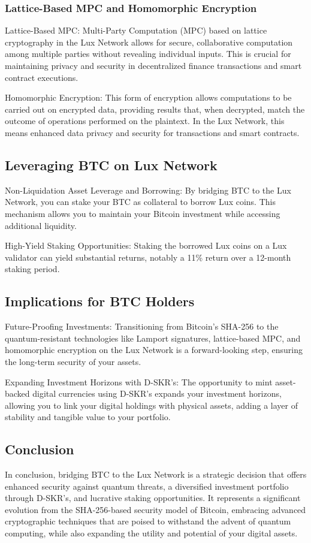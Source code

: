 \documentclass[11pt]{article}
\begin{document}
\subsubsection{Lattice-Based MPC and Homomorphic Encryption}

Lattice-Based MPC: Multi-Party Computation (MPC) based on lattice cryptography in the Lux Network allows for secure, collaborative computation among multiple parties without revealing individual inputs. This is crucial for maintaining privacy and security in decentralized finance transactions and smart contract executions.


Homomorphic Encryption: This form of encryption allows computations to be carried out on encrypted data, providing results that, when decrypted, match the outcome of operations performed on the plaintext. In the Lux Network, this means enhanced data privacy and security for transactions and smart contracts.


\subsection{Leveraging BTC on Lux Network}

Non-Liquidation Asset Leverage and Borrowing: By bridging BTC to the Lux Network, you can stake your BTC as collateral to borrow Lux coins. This mechanism allows you to maintain your Bitcoin investment while accessing additional liquidity.


High-Yield Staking Opportunities: Staking the borrowed Lux coins on a Lux validator can yield substantial returns, notably a 11\% return over a 12-month staking period.


\subsection{Implications for BTC Holders}

Future-Proofing Investments: Transitioning from Bitcoin's SHA-256 to the quantum-resistant technologies like Lamport signatures, lattice-based MPC, and homomorphic encryption on the Lux Network is a forward-looking step, ensuring the long-term security of your assets.


Expanding Investment Horizons with D-SKR's: The opportunity to mint asset-backed digital currencies using D-SKR's expands your investment horizons, allowing you to link your digital holdings with physical assets, adding a layer of stability and tangible value to your portfolio.


\subsection{Conclusion}

In conclusion, bridging BTC to the Lux Network is a strategic decision that offers enhanced security against quantum threats, a diversified investment portfolio through D-SKR's, and lucrative staking opportunities. It represents a significant evolution from the SHA-256-based security model of Bitcoin, embracing advanced cryptographic techniques that are poised to withstand the advent of quantum computing, while also expanding the utility and potential of your digital assets.
\end{document}
